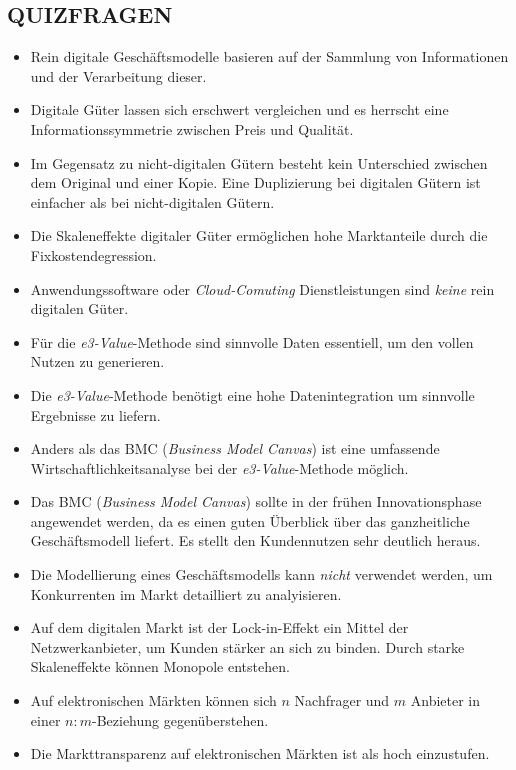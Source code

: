 \documentclass[12pt,a4paper]{article}
\begin{document}




\vspace{1cm}
\subsection{QUIZFRAGEN} %
\begin{itemize}
   \item Rein digitale Geschäftsmodelle basieren auf der Sammlung von Informationen und der Verarbeitung dieser.
   \item Digitale Güter lassen sich erschwert vergleichen und es herrscht eine Informationssymmetrie zwischen Preis und Qualität.
   \item Im Gegensatz zu nicht-digitalen Gütern besteht kein Unterschied zwischen dem Original und einer Kopie.
         Eine Duplizierung bei digitalen Gütern ist einfacher als bei nicht-digitalen Gütern.
   \item Die Skaleneffekte digitaler Güter ermöglichen hohe Marktanteile durch die Fixkostendegression.
   \item Anwendungssoftware oder \textit{Cloud-Comuting} Dienstleistungen sind \emph{keine} rein digitalen Güter.
   
   \item Für die \textit{e3-Value}-Methode sind sinnvolle Daten essentiell, um den vollen Nutzen zu generieren.
   \item Die \textit{e3-Value}-Methode benötigt eine hohe Datenintegration um sinnvolle Ergebnisse zu liefern.
   \item Anders als das BMC (\textit{Business Model Canvas}) ist eine umfassende Wirtschaftlichkeitsanalyse bei der \textit{e3-Value}-Methode möglich.
   \item Das BMC (\textit{Business Model Canvas}) sollte in der frühen Innovationsphase angewendet werden, da es einen guten Überblick über das ganzheitliche Geschäftsmodell liefert.
         Es stellt den Kundennutzen sehr deutlich heraus.
   \item Die Modellierung eines Geschäftsmodells kann \emph{nicht} verwendet werden, um Konkurrenten im Markt detailliert zu analyisieren.
   
   \item Auf dem digitalen Markt ist der Lock-in-Effekt ein Mittel der Netzwerkanbieter, um Kunden stärker an sich zu binden.
         Durch starke Skaleneffekte können Monopole entstehen.
   \item Auf elektronischen Märkten können sich $n$ Nachfrager und $m$ Anbieter in einer $n:m$-Beziehung gegenüberstehen.
   \item Die Markttransparenz auf elektronischen Märkten ist als hoch einzustufen.
\end{itemize}
\end{document}
